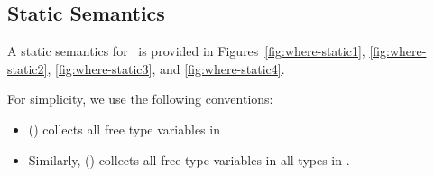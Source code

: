 %
%
%
%

\subsection{Static Semantics}\label{where-static}
A static semantics for \wherecore\ is provided in
Figures~\ref{fig:where-static1}, \ref{fig:where-static2},
\ref{fig:where-static3}, and \ref{fig:where-static4}.

For simplicity, we use the following conventions:
\begin{itemize}
\item \FTV(\ty) collects all free type variables in \ty.
\item Similarly, \FTV(\exp) collects all free type variables in all
types in \exp.
\end{itemize}

